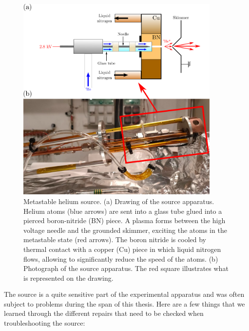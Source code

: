 \begin{figure}
    \centering
    \includegraphics[width=0.9\textwidth]{Fig/Chapter3/source_ok.png}
    \caption[Metastable helium source]{Metastable helium source. (a) Drawing of the source apparatus. Helium atoms (blue arrows) are sent into a glass tube glued into a pierced boron-nitride (BN) piece. A plasma forms between the high voltage needle and the grounded skimmer, exciting the atoms in the metastable state (red arrows). The boron nitride is cooled by thermal contact with a copper (Cu) piece in which liquid nitrogen flows, allowing to significantly reduce the speed of the atoms. (b) Photograph of the source apparatus. The red square illustrates what is represented on the drawing.}
    \label{fig:source}
\end{figure}

The source is a quite sensitive part of the experimental apparatus and was often subject to problems during the span of this thesis. Here are a few things that we learned through the different repairs that need to be checked when troubleshooting the source:

